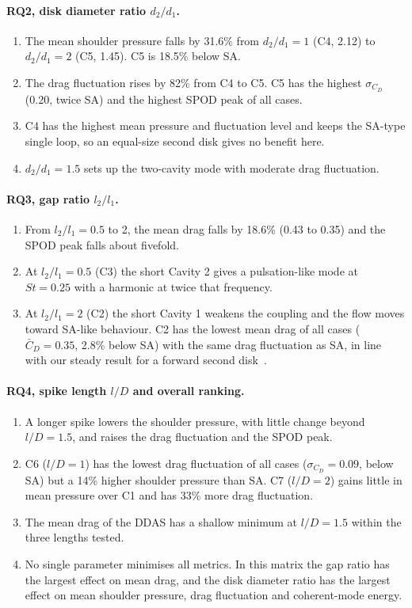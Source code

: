 \documentclass[11pt,a4paper]{article}
\newcommand{\Cdm}{\bar{C}_D}
\newcommand{\sCd}{\sigma_{C_D}}
\newcommand{\ltl}{l_2/l_1}
\newcommand{\dtd}{d_2/d_1}
\begin{document}
\paragraph{RQ2, disk diameter ratio $\dtd$.}
\begin{enumerate}
  \item The mean shoulder pressure falls by 31.6\% from $\dtd = 1$ (C4, 2.12) to $\dtd = 2$ (C5, 1.45). C5 is 18.5\% below SA.
  \item The drag fluctuation rises by 82\% from C4 to C5. C5 has the highest $\sCd$ (0.20, twice SA) and the highest SPOD peak of all cases.
  \item C4 has the highest mean pressure and fluctuation level and keeps the SA-type single loop, so an equal-size second disk gives no benefit here.
  \item $\dtd = 1.5$ sets up the two-cavity mode with moderate drag fluctuation.
\end{enumerate}

\paragraph{RQ3, gap ratio $\ltl$.}
\begin{enumerate}
  \item From $\ltl = 0.5$ to 2, the mean drag falls by 18.6\% (0.43 to 0.35) and the SPOD peak falls about fivefold.
  \item At $\ltl = 0.5$ (C3) the short Cavity 2 gives a pulsation-like mode at $St = 0.25$ with a harmonic at twice that frequency.
  \item At $\ltl = 2$ (C2) the short Cavity 1 weakens the coupling and the flow moves toward SA-like behaviour. C2 has the lowest mean drag of all cases ($\Cdm = 0.35$, 2.8\% below SA) with the same drag fluctuation as SA, in line with our steady result for a forward second disk~\cite{Gujar2026staged}.
\end{enumerate}

\paragraph{RQ4, spike length $l/D$ and overall ranking.}
\begin{enumerate}
  \item A longer spike lowers the shoulder pressure, with little change beyond $l/D = 1.5$, and raises the drag fluctuation and the SPOD peak.
  \item C6 ($l/D = 1$) has the lowest drag fluctuation of all cases ($\sCd = 0.09$, below SA) but a 14\% higher shoulder pressure than SA. C7 ($l/D = 2$) gains little in mean pressure over C1 and has 33\% more drag fluctuation.
  \item The mean drag of the DDAS has a shallow minimum at $l/D = 1.5$ within the three lengths tested.
  \item No single parameter minimises all metrics. In this matrix the gap ratio has the largest effect on mean drag, and the disk diameter ratio has the largest effect on mean shoulder pressure, drag fluctuation and coherent-mode energy.
\end{enumerate}
\end{document}
